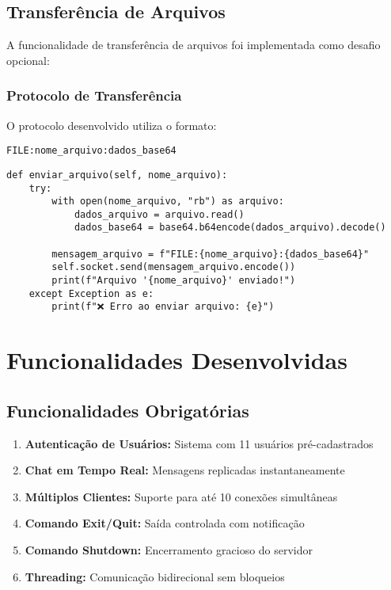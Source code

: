 \documentclass[12pt,a4paper]{article}
\begin{document}
\subsection{Transferência de Arquivos}

A funcionalidade de transferência de arquivos foi implementada como desafio opcional:

\subsubsection{Protocolo de Transferência}

O protocolo desenvolvido utiliza o formato:
\begin{center}
\texttt{FILE:nome\_arquivo:dados\_base64}
\end{center}

\begin{lstlisting}[caption=Envio de arquivo no cliente]
def enviar_arquivo(self, nome_arquivo):
    try:
        with open(nome_arquivo, "rb") as arquivo:
            dados_arquivo = arquivo.read()
            dados_base64 = base64.b64encode(dados_arquivo).decode()
        
        mensagem_arquivo = f"FILE:{nome_arquivo}:{dados_base64}"
        self.socket.send(mensagem_arquivo.encode())
        print(f"Arquivo '{nome_arquivo}' enviado!")
    except Exception as e:
        print(f"❌ Erro ao enviar arquivo: {e}")
\end{lstlisting}

\section{Funcionalidades Desenvolvidas}

\subsection{Funcionalidades Obrigatórias}

\begin{enumerate}
    \item \textbf{Autenticação de Usuários:} Sistema com 11 usuários pré-cadastrados
    \item \textbf{Chat em Tempo Real:} Mensagens replicadas instantaneamente
    \item \textbf{Múltiplos Clientes:} Suporte para até 10 conexões simultâneas
    \item \textbf{Comando Exit/Quit:} Saída controlada com notificação
    \item \textbf{Comando Shutdown:} Encerramento gracioso do servidor
    \item \textbf{Threading:} Comunicação bidirecional sem bloqueios
\end{enumerate}
\end{document}
